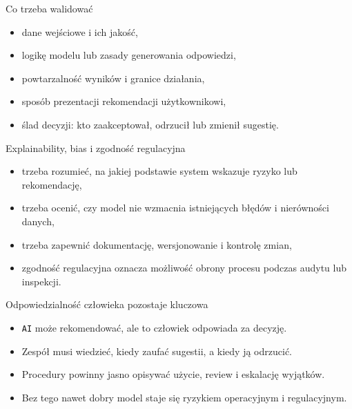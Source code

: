 \begin{frame}{Co trzeba walidować}
  \begin{itemize}
    \item dane wejściowe i ich jakość,
    \item logikę modelu lub zasady generowania odpowiedzi,
    \item powtarzalność wyników i granice działania,
    \item sposób prezentacji rekomendacji użytkownikowi,
    \item ślad decyzji: kto zaakceptował, odrzucił lub zmienił sugestię.
  \end{itemize}
\end{frame}

\begin{frame}{Explainability, bias i zgodność regulacyjna}
  \begin{itemize}
    \item trzeba rozumieć, na jakiej podstawie system wskazuje ryzyko lub rekomendację,
    \item trzeba ocenić, czy model nie wzmacnia istniejących błędów i nierówności danych,
    \item trzeba zapewnić dokumentację, wersjonowanie i kontrolę zmian,
    \item zgodność regulacyjna oznacza możliwość obrony procesu podczas audytu lub inspekcji.
  \end{itemize}
\end{frame}

\begin{frame}{Odpowiedzialność człowieka pozostaje kluczowa}
  \begin{itemize}
    \item \texttt{AI} może rekomendować, ale to człowiek odpowiada za decyzję.
    \item Zespół musi wiedzieć, kiedy zaufać sugestii, a kiedy ją odrzucić.
    \item Procedury powinny jasno opisywać użycie, review i eskalację wyjątków.
    \item Bez tego nawet dobry model staje się ryzykiem operacyjnym i regulacyjnym.
  \end{itemize}
\end{frame}


